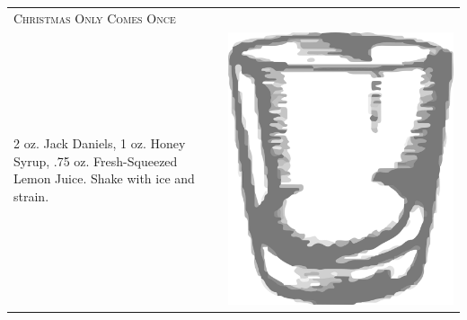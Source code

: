 \documentclass{article}
\begin{document}
\begin{multicols}{2}
\begin{tabular}{p{2in} p{0.5in}}
\multicolumn{2}{p{3in}}{\centering\Huge\textsc{Christmas Only Comes Once}} \\ 
   \vspace{-0.1in}2 oz. Jack Daniels, 1 oz. Honey Syrup, .75 oz. Fresh-Squeezed Lemon Juice. Shake with ice and strain. &
   \vspace{-0.1in} \includegraphics{rocks_glass.png}
\end{tabular}


\end{multicols}
\end{document}
